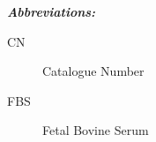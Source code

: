 \textit{\textbf{Abbreviations:}}
\begin{description}
\item[CN] Catalogue Number
\item[FBS] Fetal Bovine Serum


\end{description}